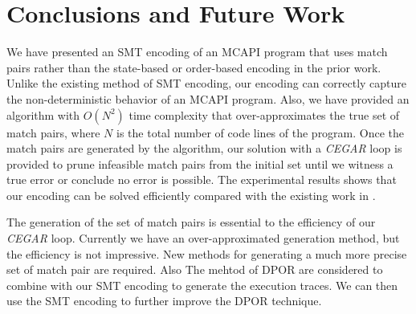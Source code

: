 \section{Conclusions and Future Work}
We have presented an SMT encoding of an MCAPI program that uses match pairs rather than the state-based or order-based encoding in the prior work. Unlike the existing method of SMT encoding, our encoding can correctly capture the non-deterministic behavior of an MCAPI program. Also, we have provided an algorithm with $O(N^2)$ time complexity that over-approximates the true set of match pairs, where $N$ is the total number of code lines of the program. Once the match pairs are generated by the algorithm, our solution with a \textit{CEGAR} loop is provided to prune infeasible match pairs from the initial set until we witness a true error or conclude no error is possible. The experimental results shows that our encoding can be solved efficiently compared with the existing work in \cite{elwakil:padtad10}.

The generation of the set of match pairs is essential to the efficiency of our \textit{CEGAR} loop. Currently we have an over-approximated generation method, but the efficiency is not impressive. New methods for generating a much more precise set of match pair are required. Also The mehtod of DPOR are considered to combine with our SMT encoding to generate the execution traces. We can then use the SMT encoding to further improve the DPOR technique. 